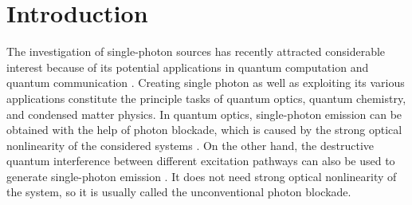 \documentclass[aps,prb,
superscriptaddress,
,twocolumn
,floatfix,footinbib,longbibliography,
]{revtex4-2}
\begin{document}
\section{Introduction}
The investigation of single-photon sources has recently attracted considerable
interest because of its potential applications in quantum computation and quantum communication \cite{knill2001scheme,walther2005experimental,ladd2010quantum,RevModPhys.81.1301}.
Creating single photon as well as exploiting its various applications constitute the principle
tasks of quantum optics, quantum chemistry, and condensed matter physics. In quantum optics, single-photon
emission can be obtained with the help of photon blockade, which is caused by the strong optical nonlinearity of the considered systems
\cite{blinov2004observation,dayan2008photon,faraon2008coherent,PhysRevLett.107.063601,PhysRevLett.106.243601,PhysRevLett.118.133604}.
On the other hand, the destructive quantum
interference between different excitation pathways can also be used to generate single-photon
emission \cite{PhysRevLett.104.183601,PhysRevLett.108.183601,PhysRevA.88.033836,PhysRevA.90.043822,PhysRevA.98.053801}. It does not need strong optical nonlinearity of the system, so it is usually called the unconventional photon blockade. 
\end{document}
